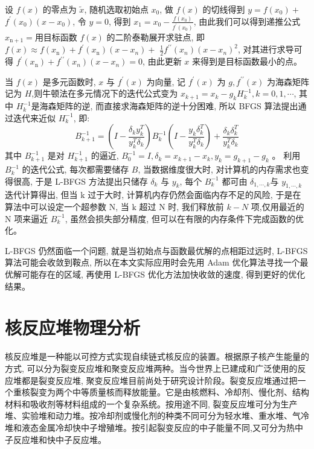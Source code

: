 \documentclass{Sichuan Normal University}
\begin{document}
设 $f(x)$ 的零点为 $\tilde{x}$, 随机选取初始点 $x_0$, 做 $f(x)$ 的切线得到 $y=f\left(x_0\right)+$ $f^{\prime}\left(x_0\right)\left(x-x_0\right)$, 令 $y=0$, 得到 $x_1=x_0-\frac{f\left(x_0\right)}{f^{\prime}\left(x_0\right)}$, 
由此我们可以得到递推公式 $x_{\mathrm{n}+1}=$用目标函数 $f(x)$ 的二阶泰勒展开求驻点, 即 $f(x) \approx f\left(x_{\mathrm{n}}\right)+f^{\prime}\left(x_{\mathrm{n}}\right)\left(x-x_n\right)+$ $\frac{1}{2} f^{\prime \prime}\left(x_n\right)\left(x-x_n\right)^2$, 
对其进行求导可得 $f^{\prime}\left(x_{\mathrm{n}}\right)+f^{\prime \prime}\left(x_n\right)\left(x-x_n\right)=0$, 由此更新 $x$ 来得到是目标函数最小的点。

当 $f(x)$ 是多元函数时, $x$ 与 $f^{\prime}(x)$ 为向量, 记 $f^{\prime}(x)$ 为 $g, f^{\prime \prime}(x)$ 为海森矩阵记为 $H$,则牛顿法在多元情况下的迭代公式变为 $x_{k+1}=x_k-g_k H_k^{-1}, k=0,1, \cdots$, 其中 $H_k^{-1}$是海森矩阵的逆, 
而直接求海森矩阵的逆十分困难, 所以 BFGS 算法提出通过迭代来近似 $H_k^{-1}$, 即:
\begin{equation}
    B_{k+1}^{-1}=\left(I-\frac{\delta_k y_k^T}{y_k^T \delta_k}\right) B_k^{-1}\left(I-\frac{y_k \delta_k^T}{y_k^T \delta_k}\right)+\frac{\delta_k \delta_k^T}{y_k^T \delta_k}
\label{eq:BFGS}
\end{equation}其中 $B_{k+1}^{-1}$ 是对 $H_{k+1}^{-1}$ 的逼近, $B_0^{-1}=I, \delta_k=x_{k+1}-x_k, y_k=g_{k+1}-g_k$ 。
利用 $B_k^{-1}$ 的迭代公式, 每次都需要储存 $B$, 当数据维度很大时, 对计算机的内存需求也变得很高, 于是 L-BFGS 方法提出只储存 $\delta_k$ 与 $y_k$, 每个 $B_k^{-1}$ 都可由 $\delta_{1, \cdots, k}$与 $y_{1, \cdots, k}$ 迭代计算得出, 但当 $\mathrm{k}$ 过于大时, 计算机内存仍然会面临内存不足的风险, 于是在算法中可以设定一个超参数 $\mathrm{N}$, 当 $\mathrm{k}$ 超过 $\mathrm{N}$ 时, 我们释放前 $k-N$ 项,仅用最近的 $\mathrm{N}$ 项来逼近 $B_k^{-1}$, 虽然会损失部分精度, 但可以在有限的内存条件下完成函数的优化。

L-BFGS 仍然面临一个问题, 就是当初始点与函数最优解的点相距过远时, L-BFGS 算法可能会收敛到鞍点, 所以在本文实际应用时会先用 Adam 优化算法寻找一个最优解可能存在的区域, 再使用 L-BFGS 优化方法加快收敛的速度, 得到更好的优化结果。

\section{核反应堆物理分析}

核反应堆是一种能以可控方式实现自续链式核反应的装置。根据原子核产生能量的方式, 可以分为裂变反应堆和聚变反应堆两种\cite{XieZhongShengHeFanYingDuiWuLiFenXi2020}。当今世界上已建成和广泛使用的反应堆都是裂变反应堆, 聚变反应堆目前尚处于研究设计阶段。裂变反应堆通过把一个重核裂变为两个中等质量核而释放能量。它是由核燃料、冷却剂、慢化剂、结构材料和吸收剂等材料组成的一个复杂系统。按用途不同, 裂变反应堆可分为生产堆、实验堆和动力堆。按冷却剂或慢化剂的种类不同可分为轻水堆、重水堆、气冷堆和液态金属冷却快中子增殖堆。按引起裂变反应的中子能量不同,又可分为热中子反应堆和快中子反应堆。
\end{document}
